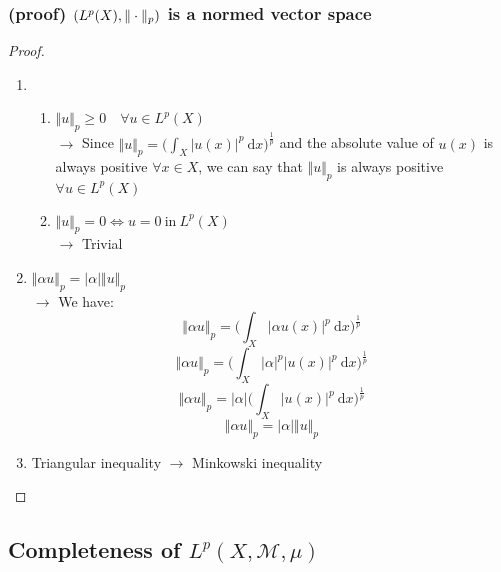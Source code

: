 \subsubsection{(proof) $(L^p(X),\Vert \cdot \Vert_p)$ is a normed vector space}
\begin{proof}\ 
\begin{enumerate}
    \item 
        \begin{enumerate}[label=(\alph*)]
            \item $\Vert u\Vert_p\geq 0 \quad \forall u \in L^p(X)$\\
            $\to$ Since $\Vert u\Vert_p=\Big (\int_X|u(x)|^p\ \mathrm dx\Big )^{\frac 1p}$ and the absolute value of $u(x)$ is always positive $\forall x\in X$, we can say that $\Vert u\Vert _p$ is always positive $\forall u \in L^p(X)$
            \item $\Vert u\Vert_p=0\iff u=0\ \text{in} \ L^p(X)$\\
            $\to$ Trivial
        \end{enumerate}
    \item $\Vert \alpha u \Vert_p=|\alpha |\Vert u\Vert_p $\\
    $\to$ We have: $$\Vert \alpha u\Vert_p=\Big (\int_X|\alpha u(x)|^p\ \mathrm dx\Big )^{\frac 1p}$$
    $$\Vert \alpha u\Vert_p=\Big (\int_X|\alpha|^p|u(x)|^p\ \mathrm dx\Big )^{\frac 1p}$$
    $$\Vert \alpha u\Vert_p=|\alpha|\Big (\int_X|u(x)|^p\ \mathrm dx\Big )^{\frac 1p}$$
    $$\Vert \alpha u\Vert_p=|\alpha |\Vert u\Vert_p $$
    \item Triangular inequality $\to$ Minkowski inequality
\end{enumerate}
\end{proof}

\subsection{Completeness of $L^p(X,\mathcal M,\mu)$}
